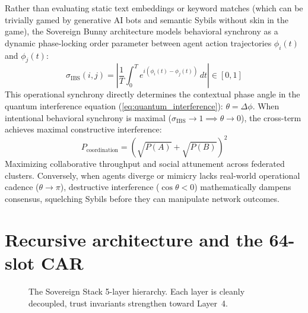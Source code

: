 \documentclass[a4paper,11pt,twoside,parskip=half-,headings=small]{scrartcl}
\begin{document}
Rather than evaluating static text embeddings or keyword matches (which can be trivially gamed by generative AI bots and semantic Sybils without skin in the game), the Sovereign Bunny architecture models behavioral synchrony as a dynamic phase-locking order parameter between agent action trajectories $\phi_i(t)$ and $\phi_j(t)$:
\begin{equation}
  \sigma_{\text{IBS}}(i, j) = \left| \frac{1}{T} \int_0^T e^{i (\phi_i(t) - \phi_j(t))} \, dt \right| \in [0, 1]
  \label{eq:ibs_synchrony}
\end{equation}
This operational synchrony directly determines the contextual phase angle in the quantum interference equation (\cref{eq:quantum_interference}): $\theta = \Delta \phi$. When intentional behavioral synchrony is maximal ($\sigma_{\text{IBS}} \to 1 \implies \theta \to 0$), the cross-term achieves maximal constructive interference:
\begin{equation}
  P_{\text{coordination}} = \left( \sqrt{P(A)} + \sqrt{P(B)} \right)^2
\end{equation}
Maximizing collaborative throughput and social attunement across federated clusters. Conversely, when agents diverge or mimicry lacks real-world operational cadence ($\theta \to \pi$), destructive interference ($\cos \theta < 0$) mathematically dampens consensus, squelching Sybils before they can manipulate network outcomes.

\section{Recursive architecture and the 64-slot CAR}
\label{sec:arch}

\begin{figure}[H]
\centering
{}
\caption{The Sovereign Stack 5-layer hierarchy. Each layer is cleanly decoupled, trust invariants strengthen toward Layer~4.}
\label{fig:stack}
\end{figure}
\end{document}
